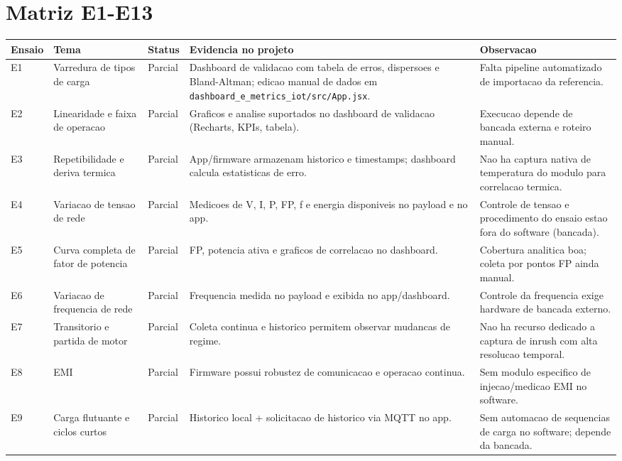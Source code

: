 \documentclass[11pt,a4paper]{article}
\begin{document}
\section*{Matriz E1-E13}
\renewcommand{\arraystretch}{1.2}
\begin{longtable}{L{1cm} L{2.8cm} L{2.1cm} L{6.9cm} L{2.7cm}}
\hline
\textbf{Ensaio} & \textbf{Tema} & \textbf{Status} & \textbf{Evidencia no projeto} & \textbf{Observacao} \\
\hline
E1 & Varredura de tipos de carga & Parcial & Dashboard de validacao com tabela de erros, dispersoes e Bland-Altman; edicao manual de dados em \texttt{dashboard\_e\_metrics\_iot/src/App.jsx}. & Falta pipeline automatizado de importacao da referencia. \\
\hline
E2 & Linearidade e faixa de operacao & Parcial & Graficos e analise suportados no dashboard de validacao (Recharts, KPIs, tabela). & Execucao depende de bancada externa e roteiro manual. \\
\hline
E3 & Repetibilidade e deriva termica & Parcial & App/firmware armazenam historico e timestamps; dashboard calcula estatisticas de erro. & Nao ha captura nativa de temperatura do modulo para correlacao termica. \\
\hline
E4 & Variacao de tensao de rede & Parcial & Medicoes de V, I, P, FP, f e energia disponiveis no payload e no app. & Controle de tensao e procedimento do ensaio estao fora do software (bancada). \\
\hline
E5 & Curva completa de fator de potencia & Parcial & FP, potencia ativa e graficos de correlacao no dashboard. & Cobertura analitica boa; coleta por pontos FP ainda manual. \\
\hline
E6 & Variacao de frequencia de rede & Parcial & Frequencia medida no payload e exibida no app/dashboard. & Controle da frequencia exige hardware de bancada externo. \\
\hline
E7 & Transitorio e partida de motor & Parcial & Coleta continua e historico permitem observar mudancas de regime. & Nao ha recurso dedicado a captura de inrush com alta resolucao temporal. \\
\hline
E8 & EMI & Parcial & Firmware possui robustez de comunicacao e operacao continua. & Sem modulo especifico de injecao/medicao EMI no software. \\
\hline
E9 & Carga flutuante e ciclos curtos & Parcial & Historico local + solicitacao de historico via MQTT no app. & Sem automacao de sequencias de carga no software; depende da bancada. \\

\end{longtable}
\end{document}
